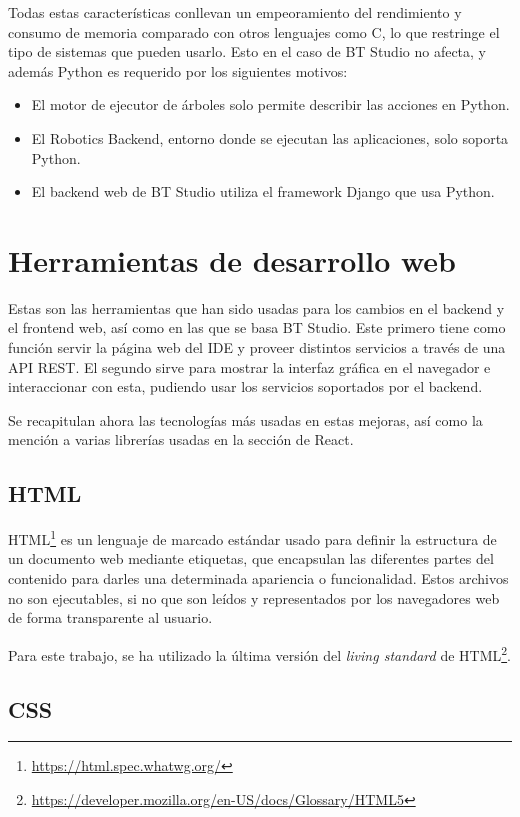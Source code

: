 Todas estas características conllevan un empeoramiento del rendimiento y consumo de memoria comparado con otros lenguajes como C, lo que restringe el tipo de sistemas que pueden usarlo. Esto en el caso de BT Studio no afecta, y además Python es requerido por los siguientes motivos:

\begin{itemize}
    \item El motor de ejecutor de árboles solo permite describir las acciones en Python.
    \item El Robotics Backend, entorno donde se ejecutan las aplicaciones, solo soporta Python. 
    \item El backend web de BT Studio utiliza el framework Django que usa Python. 
\end{itemize}

\section{Herramientas de desarrollo web}

Estas son las herramientas que han sido usadas para los cambios en el backend y el frontend web, así como en las que se basa BT Studio. Este primero tiene como función servir la página web del IDE y proveer distintos servicios a través de una API REST. El segundo sirve para mostrar la interfaz gráfica en el navegador e interaccionar con esta, pudiendo usar los servicios soportados por el backend.

Se recapitulan ahora las tecnologías más usadas en estas mejoras, así como la mención a varias librerías usadas en la sección de React.

\subsection{HTML}

HTML\footnote{\url{https://html.spec.whatwg.org/}} es un lenguaje de marcado estándar usado para definir la estructura de un documento web mediante etiquetas, que encapsulan las diferentes partes del contenido para darles una determinada apariencia o funcionalidad. Estos archivos no son ejecutables, si no que son leídos y representados por los navegadores web de forma transparente al usuario. 

Para este trabajo, se ha utilizado la última versión del \textit{living standard} de HTML\footnote{\url{https://developer.mozilla.org/en-US/docs/Glossary/HTML5}}. 

\subsection{CSS}

